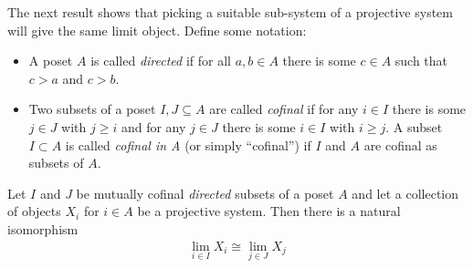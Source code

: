       The next result shows that picking a suitable sub-system of a projective system will give the same limit object.
      Define some notation:
      \begin{itemize}
        \item A poset $A$ is called \emph{directed} if for all $a,b\in A$ there is some $c\in A$ such that $c>a$ and $c>b$.
        \item Two subsets of a poset $I,J\subseteq A$ are called \emph{cofinal} if for any $i\in I$ there is some $j\in J$ with $j\ge i$ and for any $j\in J$ there is some $i\in I$ with $i\ge j$.
          A subset $I\subset A$ is called \emph{cofinal in A} (or simply ``cofinal'') if $I$ and $A$ are cofinal as subsets of $A$.
      \end{itemize}
      \begin{thm}
        \label{thm:cofinalisom}
        Let $I$ and $J$ be mutually cofinal \emph{directed} subsets of a poset $A$ and let a collection of objects $X_i$ for $i\in A$ be a projective system.
        Then there is a natural isomorphism
        \begin{align*}
          \lim_{i\in I} X_i \cong \lim_{j\in J} X_j
        \end{align*}
      \end{thm}
